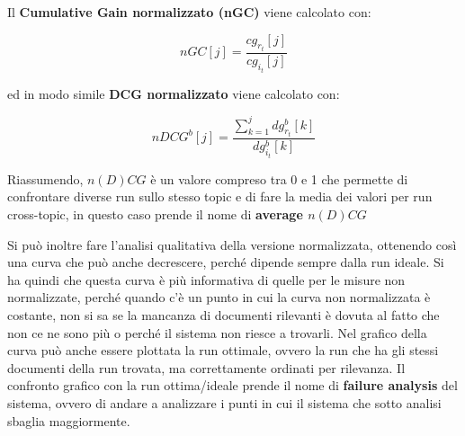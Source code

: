 Il \textbf{Cumulative Gain normalizzato (nGC)} viene calcolato con:

$$
nGC[j] = \frac{cg_{r_t}[j]}{cg_{i_t}[j]}
$$

ed in modo simile \textbf{DCG normalizzato} viene calcolato con:

$$
nDCG^b[j] = \frac{\sum_{k=1}^j dg_{r_t}^b[k]}{dg_{i_t}^b[k]}
$$

Riassumendo, $n(D)CG$ è un valore compreso tra 0 e 1 che permette di confrontare diverse run sullo stesso topic e di fare la media dei valori per run cross-topic, in questo caso prende il nome di \textbf{average $n(D)CG$}

Si può inoltre fare l'analisi qualitativa della versione normalizzata, ottenendo così una curva che può anche decrescere, perché dipende sempre dalla run ideale. Si ha quindi che questa curva è più informativa di quelle per le misure non normalizzate, perché quando c'è un punto in cui la curva non normalizzata è costante, non si sa se la mancanza di documenti rilevanti è dovuta al fatto che non ce ne sono più o perché il sistema non riesce a trovarli.
Nel grafico della curva può anche essere plottata la run ottimale, ovvero la run che ha gli stessi documenti della run trovata, ma correttamente ordinati per rilevanza. 
Il confronto grafico con la run ottima/ideale prende il nome di \textbf{failure analysis} del sistema, ovvero di andare a analizzare i punti in cui il sistema che sotto analisi sbaglia maggiormente.


